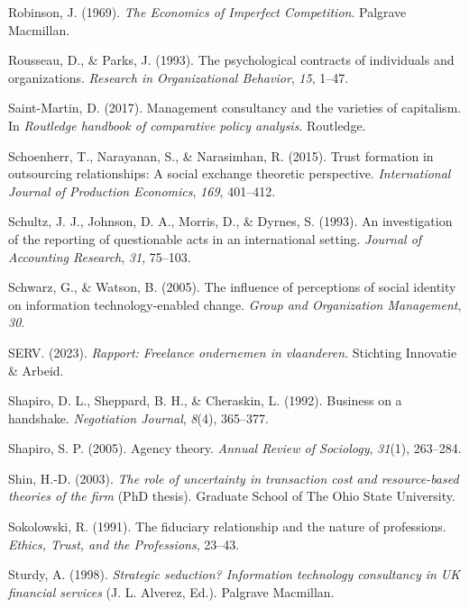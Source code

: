 \documentclass[
  man,floatsintext]{apa6}
\newlength{\cslhangindent}
\newenvironment{CSLReferences}[2] %
 {\begin{list}{}{%
  \setlength{\itemindent}{0pt}
  \setlength{\leftmargin}{0pt}
  \setlength{\parsep}{0pt}
  \ifodd #1
   \setlength{\leftmargin}{\cslhangindent}
   \setlength{\itemindent}{-1\cslhangindent}
  \fi
  \setlength{\itemsep}{#2\baselineskip}}}
 {\end{list}}
\begin{document}
\begin{CSLReferences}{1}{0}
Robinson, J. (1969). \emph{{The Economics of Imperfect Competition}}. Palgrave Macmillan.

Rousseau, D., \& Parks, J. (1993). The psychological contracts of individuals and organizations. \emph{Research in Organizational Behavior}, \emph{15}, 1--47.

Saint-Martin, D. (2017). Management consultancy and the varieties of capitalism. In \emph{Routledge handbook of comparative policy analysis}. Routledge.

Schoenherr, T., Narayanan, S., \& Narasimhan, R. (2015). Trust formation in outsourcing relationships: A social exchange theoretic perspective. \emph{International Journal of Production Economics}, \emph{169}, 401--412.

Schultz, J. J., Johnson, D. A., Morris, D., \& Dyrnes, S. (1993). An investigation of the reporting of questionable acts in an international setting. \emph{Journal of Accounting Research}, \emph{31}, 75--103.

Schwarz, G., \& Watson, B. (2005). The influence of perceptions of social identity on information technology-enabled change. \emph{Group and Organization Management}, \emph{30}.

SERV. (2023). \emph{Rapport: Freelance ondernemen in vlaanderen}. Stichting Innovatie \& Arbeid.

Shapiro, D. L., Sheppard, B. H., \& Cheraskin, L. (1992). Business on a handshake. \emph{Negotiation Journal}, \emph{8}(4), 365--377.

Shapiro, S. P. (2005). Agency theory. \emph{Annual Review of Sociology}, \emph{31}(1), 263--284.

Shin, H.-D. (2003). \emph{The role of uncertainty in transaction cost and resource-based theories of the firm} (PhD thesis). Graduate School of The Ohio State University.

Sokolowski, R. (1991). The fiduciary relationship and the nature of professions. \emph{Ethics, Trust, and the Professions}, 23--43.

Sturdy, A. (1998). \emph{Strategic seduction? Information technology consultancy in UK financial services} (J. L. Alverez, Ed.). Palgrave Macmillan.


\end{CSLReferences}
\end{document}
